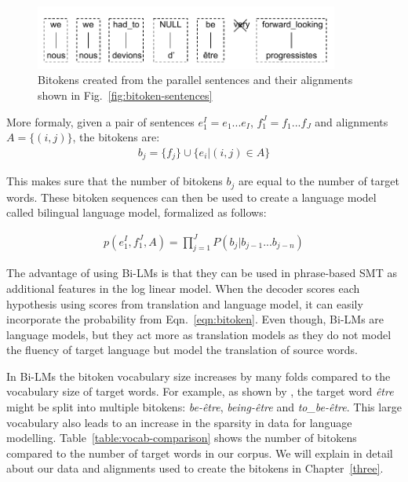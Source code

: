 \begin{figure}[htbp]
	\begin{center}
		\includegraphics[width=10cm]{files/images/bitoken-example2}
	\end{center}
	\caption{Bitokens created from the parallel sentences and their alignments shown in Fig.~\ref{fig:bitoken-sentences}}
	\label{fig:bitokens}
\end{figure}

More formaly, given a pair of sentences $e_1^I = e_1 ... e_I$, $f_1^J = f_1 ... f_J$ and alignments $A=\{(i, j)\}$, the bitokens are:
\begin{eqnarray}
	b_j = \{f_j\} \cup \{e_i | (i, j) \in A\}
\end{eqnarray}

This makes sure that the number of bitokens $b_j$ are equal to the number of target words. These bitoken sequences can then be used to create a language model called bilingual language model, formalized as follows:

\begin{eqnarray}\label{eqn:bitoken}
p(e_1^I, f_1^J, A) = \prod_{j=1}^J P(b_j | b_{j-1}...b_{j-n})
\end{eqnarray}

The advantage of using Bi-LMs is that they can be used in phrase-based SMT as additional features in the log linear model. When the decoder scores each hypothesis using scores from translation and language model, it can easily incorporate the probability from Eqn.~\ref{eqn:bitoken}. Even though, Bi-LMs are language models, but they act more as translation models as they do not model the fluency of target language but model the translation of source words.

In Bi-LMs the bitoken vocabulary size increases by many folds compared to the vocabulary size of target words. For example, as shown by \cite{Stewart2014}, the target word \textit{être} might be split into multiple bitokens: \textit{be-être}, \textit{being-être} and \textit{to\_be-être}. This large vocabulary also leads to an increase in the sparsity in data for language modelling. Table~\ref{table:vocab-comparison} shows the number of bitokens compared to the number of target words in our corpus. We will explain in detail about our data and alignments used to create the bitokens in Chapter~\ref{three}. 

